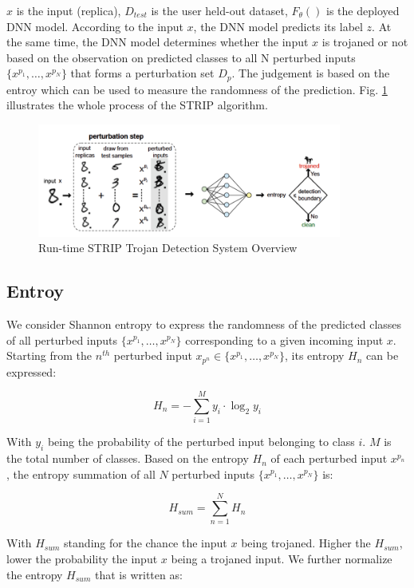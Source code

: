 \documentclass[letterpaper]{article}
\begin{document}
$x$ is the input (replica), $D_{test}$ is the user held-out dataset, $F_\theta()$ is the deployed DNN model. According to the input $x$, the DNN model predicts its label $z$. At the same time, the DNN
model determines whether the input $x$ is trojaned or not based on the observation on predicted classes to all N perturbed inputs $\{x^{p_1}, \dotsc, x^{p_N}\}$ that forms a perturbation set $D_p$. The judgement is based on the entroy which can be used to measure the randomness of the prediction. Fig. \ref{fig:strip_5} illustrates the whole process of the STRIP algorithm.

\begin{figure}[H]
    \centering
    \includegraphics[width=10cm]{img/strip_5.png}
    \caption{Run-time STRIP Trojan Detection System Overview}
    \label{fig:strip_5}
\end{figure}

\subsection*{Entroy}
We consider Shannon entropy to express the randomness of the predicted classes of all perturbed inputs $\{x^{p_1}, \dotsc, x^{p_N}\}$ corresponding to a given incoming input $x$. Starting from the $n^{th}$ perturbed input $x_{p^n} \in \{x^{p_1}, \dotsc, x^{p_N}\}$, its entropy $H_n$ can be expressed:

\begin{equation*}
    H_n = -\sum_{i=1}^M y_i \cdot \log_2 y_i
\end{equation*}

With $y_i$ being the probability of the perturbed input belonging to class $i$. $M$ is the total number of classes. Based on the entropy $H_n$ of each perturbed input $x^{p_n}$, the entropy summation of all $N$ perturbed inputs $\{x^{p_1}, \dotsc, x^{p_N}\}$ is:

\begin{equation*}
    H_{sum} = \sum_{n=1}^N H_n
\end{equation*}

With $H_{sum}$ standing for the chance the input $x$ being trojaned. Higher the $H_{sum}$, lower the probability the input $x$ being a trojaned input.
We further normalize the entropy $H_{sum}$ that is written as:
\end{document}
